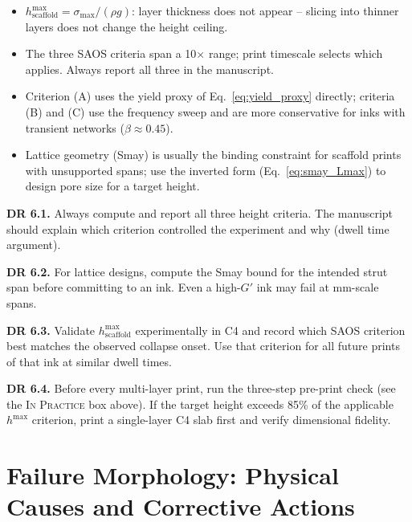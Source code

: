 \documentclass[11pt,a4paper]{article}
\begin{document}
\begin{takeawaybox}
\begin{itemize}[leftmargin=1.4em,itemsep=2pt]
\item $h_\mathrm{scaffold}^{\max}=\sigma_\mathrm{max}/(\rho g)$:
  layer thickness does not appear -- slicing into thinner layers does
  not change the height ceiling.
\item The three SAOS criteria span a 10$\times$ range; print timescale
  selects which applies.  Always report all three in the manuscript.
\item Criterion (A) uses the yield proxy of Eq.~\eqref{eq:yield_proxy}
  directly; criteria (B) and (C) use the frequency sweep and are more
  conservative for inks with transient networks ($\beta\approx0.45$).
\item Lattice geometry (Smay) is usually the binding constraint for
  scaffold prints with unsupported spans; use the inverted form
  (Eq.~\ref{eq:smay_Lmax}) to design pore size for a target height.
\end{itemize}
\end{takeawaybox}

\begin{designrulebox}
\textbf{DR 6.1.} Always compute and report all three height criteria.
The manuscript should explain which criterion controlled the experiment
and why (dwell time argument).

\textbf{DR 6.2.} For lattice designs, compute the Smay bound for the
intended strut span before committing to an ink. Even a high-$G'$ ink
may fail at mm-scale spans.

\textbf{DR 6.3.} Validate $h_\mathrm{scaffold}^{\max}$ experimentally
in C4 and record which SAOS criterion best matches the observed
collapse onset. Use that criterion for all future prints of that ink
at similar dwell times.

\textbf{DR 6.4.} Before every multi-layer print, run the three-step
pre-print check (see the \textsc{In Practice} box above).  If the
target height exceeds 85\% of the applicable $h^{\max}$ criterion,
print a single-layer C4 slab first and verify dimensional fidelity.
\end{designrulebox}

\section{Failure Morphology: Physical Causes and Corrective Actions}
\label{sec:failure}
\label{sec:failures}
\end{document}
